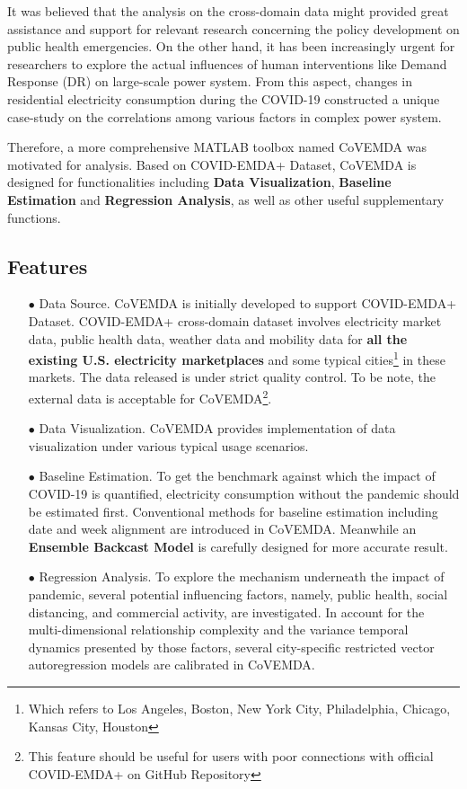 \documentclass[10pt]{article}
\newcommand{\covemda}{CoVEMDA}
\numberwithin{equation}{section}
\numberwithin{table}{section}
\numberwithin{figure}{section}
\begin{document}
It was believed that the analysis on the cross-domain data might provided great assistance and support for relevant research concerning the policy development on public health emergencies. On the other hand, it has been increasingly urgent for researchers to explore the actual influences of human interventions like Demand Response (DR) on large-scale power system. From this aspect, changes in residential electricity consumption during the COVID-19 constructed a unique case-study on the correlations among various factors in complex power system.

Therefore, a more comprehensive MATLAB toolbox named CoVEMDA was motivated for analysis. Based on COVID-EMDA+ Dataset, CoVEMDA is designed for functionalities including \textbf{Data Visualization}, \textbf{Baseline Estimation} and \textbf{Regression Analysis}, as well as other useful supplementary functions.
\subsection{Features}
\begin{itemize}
    \item[$\bullet$] Data Source. \covemda{} is initially developed to support COVID-EMDA+ Dataset. COVID-EMDA+ cross-domain dataset involves electricity market data, public health data, weather data and mobility data for \textbf{all the existing U.S. electricity marketplaces} and some typical cities\footnote{Which refers to Los Angeles, Boston, New York City, Philadelphia, Chicago, Kansas City, Houston} in these markets. The data released is under strict quality control. To be note, the external data is acceptable for \covemda{}\footnote{This feature should be useful for users with poor connections with official COVID-EMDA+ on GitHub Repository}.
    
    \item[$\bullet$] Data Visualization. \covemda{} provides implementation of data visualization under various typical usage scenarios.
    
    \item[$\bullet$] Baseline Estimation. To get the benchmark against which the impact of COVID-19 is quantified, electricity consumption without the pandemic should be estimated first. Conventional methods for baseline estimation including date and week alignment are introduced in \covemda{}. Meanwhile an \textbf{Ensemble Backcast Model} is carefully designed for more accurate result.
    
    \item[$\bullet$] Regression Analysis. To explore the mechanism underneath the impact of pandemic, several potential influencing factors, namely, public health, social distancing, and commercial activity, are investigated. In account for the multi-dimensional relationship complexity and the variance temporal dynamics presented by those factors, several city-specific restricted vector autoregression models are calibrated in \covemda{}.
\end{itemize}
\end{document}

